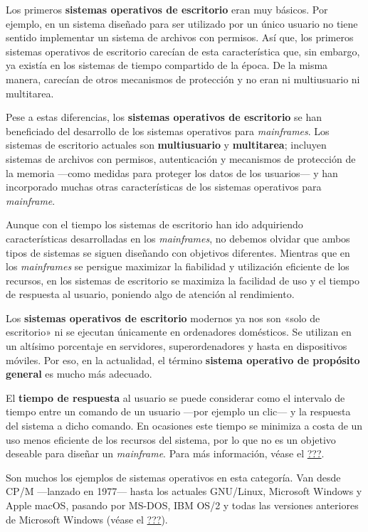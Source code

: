 Los primeros \textbf{sistemas operativos de escritorio} eran muy
básicos. Por ejemplo, en un sistema diseñado para ser utilizado por un
único usuario no tiene sentido implementar un sistema de archivos con
permisos. Así que, los primeros sistemas operativos de escritorio
carecían de esta característica que, sin embargo, ya existía en los
sistemas de tiempo compartido de la época. De la misma manera, carecían
de otros mecanismos de protección y no eran ni multiusuario ni
multitarea.

Pese a estas diferencias, los \textbf{sistemas operativos de escritorio}
se han beneficiado del desarrollo de los sistemas operativos para
\emph{mainframes}. Los sistemas de escritorio actuales son
\textbf{multiusuario} y \textbf{multitarea}; incluyen sistemas de
archivos con permisos, autenticación y mecanismos de protección de la
memoria ---como medidas para proteger los datos de los usuarios--- y han
incorporado muchas otras características de los sistemas operativos para
\emph{mainframe}.

Aunque con el tiempo los sistemas de escritorio han ido adquiriendo
características desarrolladas en los \emph{mainframes}, no debemos
olvidar que ambos tipos de sistemas se siguen diseñando con objetivos
diferentes. Mientras que en los \emph{mainframes} se persigue maximizar
la fiabilidad y utilización eficiente de los recursos, en los sistemas
de escritorio se maximiza la facilidad de uso y el tiempo de respuesta
al usuario, poniendo algo de atención al rendimiento.

Los \textbf{sistemas operativos de escritorio} modernos ya nos son «solo
de escritorio» ni se ejecutan únicamente en ordenadores domésticos. Se
utilizan en un altísimo porcentaje en servidores, superordenadores y
hasta en dispositivos móviles. Por eso, en la actualidad, el término
\textbf{sistema operativo de propósito general} {} es mucho más
adecuado.

El \textbf{tiempo de respuesta} al usuario se puede considerar como el
intervalo de tiempo entre un comando de un usuario ---por ejemplo un
clic--- y la respuesta del sistema a dicho comando. En ocasiones este
tiempo se minimiza a costa de un uso menos eficiente de los recursos del
sistema, por lo que no es un objetivo deseable para diseñar un
\emph{mainframe}. Para más información, véase el
\hyperref[_criterios_de_planificaciuxf3n]{???}.

Son muchos los ejemplos de sistemas operativos en esta categoría. Van
desde CP/M ---lanzado en 1977--- hasta los actuales GNU/Linux, Microsoft
Windows y Apple macOS, pasando por MS-DOS, IBM OS/2 y todas las
versiones anteriores de Microsoft Windows (véase el
\hyperref[sect-historia-cuarta-generaciuxf3n]{???}).

